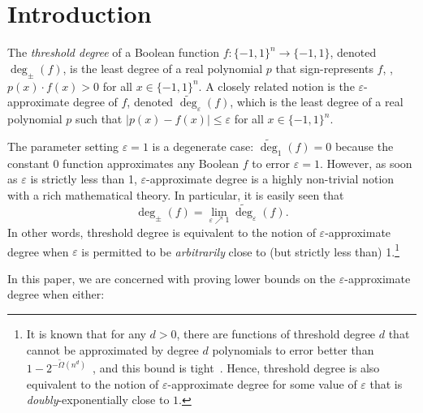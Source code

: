 \documentclass{toc}
\newcommand{\bits}{\{-1,1\}}
\newcommand{\eps}{\varepsilon}
\newcommand{\adeg}{\widetilde{\operatorname{deg}}}
\begin{document}
%
%
%



\section{Introduction}
The \emph{threshold degree} of a Boolean function $f\colon \bits^n \to \bits$, denoted $\deg_{\pm}(f)$, 
is the least degree of a real polynomial $p$ that sign-represents $f$, \ie, $p(x) \cdot f(x) > 0$
for all $x \in \bits^n$.
A closely related notion is the $\eps$-approximate degree of $f$, denoted $\adeg_{\eps}(f)$, which is the least degree of a 
real polynomial $p$ such that $|p(x)-f(x)| \leq \eps$ for all $x \in \bits^n$. 

The parameter setting $\eps=1$ is a degenerate case: $\adeg_1(f)=0$ because 
the constant 0 function approximates any Boolean $f$ to error $\eps=1$. 
However, as soon as $\eps$ is strictly less than 1, $\eps$-approximate degree is a highly non-trivial
notion with a rich mathematical theory.
In particular, it is easily seen that 
$$\deg_{\pm}(f)=\lim_{\eps \nearrow 1} \adeg_{\eps}(f).$$ In other words, threshold degree is equivalent to the notion of $\eps$-approximate
degree when $\eps$ is permitted to be \emph{arbitrarily} close to (but strictly less than) 1.\footnote{It is known that for any $d > 0$, there are functions of threshold degree $d$
	that cannot be approximated by degree $d$ polynomials to error better than $1-2^{-\tilde{\Omega}(n^d)}$~\cite{podolskii2007perceptrons},
	and this bound is tight~\cite{bvdw}. Hence, threshold degree is also equivalent to the notion of $\eps$-approximate degree for some value of $\eps$
	that is \emph{doubly}-exponentially close to $1$.}

In this paper, we are concerned with proving %
lower bounds on 
the %
$\eps$-approximate degree  %
 when either:
\end{document}
